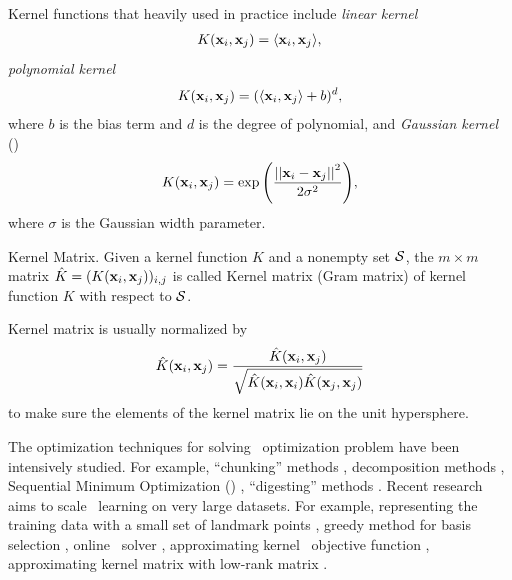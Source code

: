{Kernel functions that heavily used in practice include \textit{linear kernel}
\begin{align*}
	K(\mathbf {x}_i,\mathbf {x}_j) = \langle \mathbf {x}_i, \mathbf {x}_j \rangle,
\end{align*}
\textit{polynomial kernel}
\begin{align*}
	K(\mathbf {x}_i,\mathbf {x}_j) = (\langle \mathbf {x}_i, \mathbf {x}_j \rangle + b)^d,
\end{align*}
where $b$ is the bias term and $d$ is the degree of polynomial, and \textit{Gaussian kernel} (\rbf)
\begin{align*}
	K(\mathbf {x}_i,\mathbf {x}_j) = \exp{\left(\frac{\left|\left| {\mathbf {x}_i}-{\mathbf {x}_j} \right|\right|^2}{2\sigma^2}\right)},
\end{align*}
where $\sigma$ is the Gaussian width parameter.
\begin{definition}{Kernel Matrix.}
	Given a kernel function $K$ and a nonempty set $\mathcal{S}$, the $m\times m$ matrix $\hat{K}=(K(\mathbf {x}_i,\mathbf {x}_j))_{i,j}$ is called Kernel matrix (Gram matrix) of kernel function $K$ with respect to $\mathcal{S}$.
\end{definition}
\noindent
Kernel matrix is usually normalized by
\begin{align*}
	\hat{K}(\mathbf {x}_i,\mathbf {x}_j) = \frac{\hat{K}(\mathbf {x}_i,\mathbf {x}_j)}{\sqrt{\hat{K}(\mathbf {x}_i,\mathbf {x}_i)\hat{K}(\mathbf {x}_j,\mathbf {x}_j)}}
\end{align*}
to make sure the elements of the kernel matrix lie on the unit hypersphere.

The optimization techniques for solving \svm\ optimization problem have been intensively studied.
For example, ``chunking'' methods \citep{Vapnik82estimation,Perezcruz04double}, decomposition methods \citep{Osuna97an,Joachims98making}, {Sequential Minimum Optimization} (\smo) \citep{Platt98sequential,Platt99fast}, ``digesting'' methods \citep{Decoste02support}.
Recent research aims to scale \svm\ learning on very large datasets.
For example, representing the training data with a small set of landmark points \citep{Pavlov00towards,Boley04training,Yu05making,Zhang08improved}, greedy method for basis selection \citep{Keerthi06building}, online \svm\ solver \citep{Bordes05fast}, approximating kernel \svm\ objective function \citep{Zhang12scaling, Le13fast}, approximating kernel matrix with low-rank matrix \citep{Smola00sparse,Fine02efficient,Drineas05on,Si14memory}.



}
